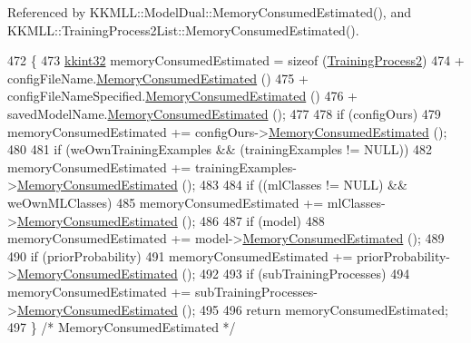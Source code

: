 Referenced by K\+K\+M\+L\+L\+::\+Model\+Dual\+::\+Memory\+Consumed\+Estimated(), and K\+K\+M\+L\+L\+::\+Training\+Process2\+List\+::\+Memory\+Consumed\+Estimated().


\begin{DoxyCode}
472 \{
473   \hyperlink{namespace_k_k_b_a8fa4952cc84fda1de4bec1fbdd8d5b1b}{kkint32}  memoryConsumedEstimated = \textcolor{keyword}{sizeof} (\hyperlink{class_k_k_m_l_l_1_1_training_process2_a56455bc6c87316ccfd3afbe4c3323f5e}{TrainingProcess2})
474     +  configFileName.\hyperlink{class_k_k_b_1_1_k_k_str_afc335bf98a8d4a77dc34215e72068719}{MemoryConsumedEstimated} ()
475     +  configFileNameSpecified.\hyperlink{class_k_k_b_1_1_k_k_str_afc335bf98a8d4a77dc34215e72068719}{MemoryConsumedEstimated} ()
476     +  savedModelName.\hyperlink{class_k_k_b_1_1_k_k_str_afc335bf98a8d4a77dc34215e72068719}{MemoryConsumedEstimated} ();
477 
478   \textcolor{keywordflow}{if}  (configOurs)
479     memoryConsumedEstimated += configOurs->\hyperlink{class_k_k_b_1_1_configuration_a494a09ab9d70eee0855079da512e7293}{MemoryConsumedEstimated} ();
480 
481   \textcolor{keywordflow}{if}  (weOwnTrainingExamples  &&  (trainingExamples != NULL))
482     memoryConsumedEstimated += trainingExamples->\hyperlink{class_k_k_m_l_l_1_1_feature_vector_list_a5a61112467b437ab3ffa7e302caa17e9}{MemoryConsumedEstimated} ();
483 
484   \textcolor{keywordflow}{if}  ((mlClasses != NULL)  &&  weOwnMLClasses)
485     memoryConsumedEstimated += mlClasses->\hyperlink{class_k_k_m_l_l_1_1_m_l_class_list_a733c0cdb921878aaf5cebd7de4527e09}{MemoryConsumedEstimated} ();
486 
487   \textcolor{keywordflow}{if}  (model)
488     memoryConsumedEstimated += model->\hyperlink{class_k_k_m_l_l_1_1_model_a8d8d22b5f8101e0749644583f818c86b}{MemoryConsumedEstimated} ();
489 
490   \textcolor{keywordflow}{if}  (priorProbability)
491     memoryConsumedEstimated += priorProbability->\hyperlink{class_k_k_m_l_l_1_1_class_prob_list_a624b9d228d1c1581026591e4d64a1d2a}{MemoryConsumedEstimated} ();
492 
493   \textcolor{keywordflow}{if}  (subTrainingProcesses)
494     memoryConsumedEstimated += subTrainingProcesses->\hyperlink{class_k_k_m_l_l_1_1_training_process2_list_aa921b859d4ddd9a6f3d649b8ba71780e}{MemoryConsumedEstimated} ();
495 
496   \textcolor{keywordflow}{return}  memoryConsumedEstimated;
497 \}  \textcolor{comment}{/* MemoryConsumedEstimated */}
\end{DoxyCode}
